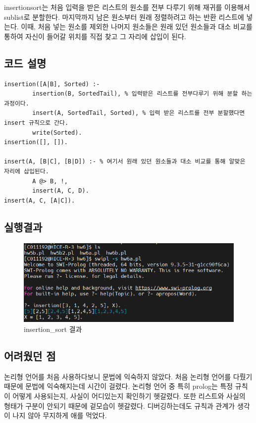 \documentclass{article}
\begin{document}
insertionsort는 처음 입력을 받은 리스트의 원소를 전부 다루기 위해 재귀를 이용해서 sublist로 분할한다. 마지막까지 남은 원소부터 원래 정렬하려고 하는 반환 리스트에 넣는다. 이때, 처음 넣는 원소를 제외한 나머지 원소들은 원래 있던 원소들과 대소 비교를 통하여 자신이 들어갈 위치를 직접 찾고 그 자리에 삽입이 된다.

\newpage

\subsection{코드 설명}
\begin{verbatim}
insertion([A|B], Sorted) :-
        insertion(B, SortedTail), % 입력받은 리스트를 전부다루기 위해 분할 하는 과정이다.
        insert(A, SortedTail, Sorted), % 입력 받은 리스트를 전부 분할했다면 insert 규칙으로 간다.
        write(Sorted).
insertion([], []).

insert(A, [B|C], [B|D]) :- % 여기서 원래 있던 원소들과 대소 비교를 통해 알맞은 자리에 삽입된다.
        A @> B, !,
        insert(A, C, D).
insert(A, C, [A|C]).

\end{verbatim}

\newpage

\subsection{실행결과}
\begin{figure}[h]
    \centering
    \includegraphics[scale = 0.7]{insert실행결과.png}
    \caption{insertion\_sort 결과}
\end{figure}

\subsection{어려웠던 점}
논리형 언어를 처음 사용하다보니 문법에 익숙하지 않았다. 처음 논리형 언어를 다뤘기 때문에 문법에 익숙해지는데 시간이 걸렸다. 논리형 언어 중 특히 prolog는 특정 규칙이 어떻게 사용되는지, 사실이 어디있는지 확인하기 헷갈렸다. 또한 리스트와 사실의 형태가 구분이 안되기 때문에 겉모습이 헷갈렸다. 디버깅하는데도 규칙과 관계가 생각이 나지 않아 무지하게 애를 먹었다.
\end{document}
